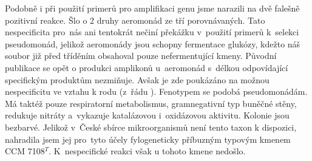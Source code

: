 Podobně i při použití primerů pro amplifikaci genu  jsme narazili na dvě falešně pozitivní reakce.
Šlo o 2 druhy aeromonád ze tří porovnávaných.
Tato nespecificita pro~nás ani tentokrát nečiní překážku v~použití primerů k~selekci pseudomonád, jelikož aeromonády jsou schopny fermentace glukózy, kdežto náš soubor již před tříděním obsahoval pouze nefermentující kmeny.
Původní publikace se opět o produkci amplikonů u~aeromonád s~délkou odpovídající specifickým produktům nezmiňuje. \cite{mulet2009rpod}
Avšak je zde poukázáno na možnou nespecificitu ve vztahu k rodu  (z~řádu ).
Fenotypem se podobá pseudomonádám.
Má taktéž pouze respiratorní metabolismus, gramnegativní typ buněčné stěny, redukuje nitráty a~vykazuje katalázovou i~oxidázovou aktivitu.
Kolonie jsou bezbarvé. \cite{garrity2005bergey}
Jelikož v~České sbírce mikroorganismů není tento taxon k dispozici, nahradila jsem jej pro~tyto účely fylogeneticky příbuzným typovým kmenem  CCM 7108$^T$.
K~nespecifické reakci však u tohoto kmene nedošlo.

